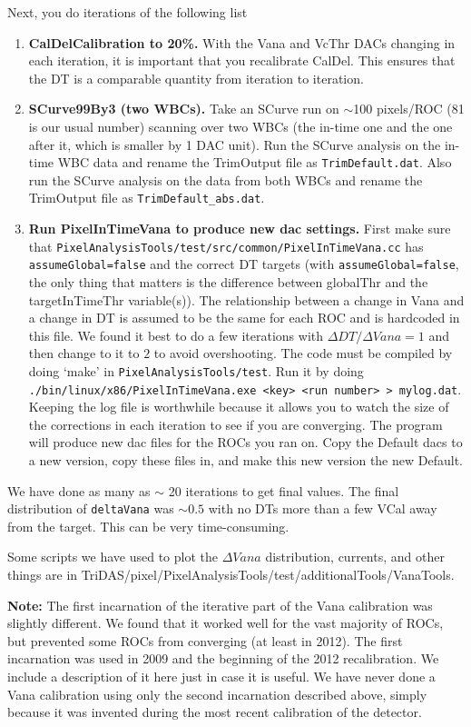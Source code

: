 Next, you do iterations of the following list
\begin{enumerate}
  \item {\bf CalDelCalibration to 20\%.}  With the Vana and VcThr DACs changing in
    each iteration, it is important that you recalibrate CalDel.  This ensures that
    the DT is a comparable quantity from iteration to iteration.
  \item {\bf SCurve99By3 (two WBCs).}  Take an SCurve run on $\sim$100 pixels/ROC (81 is our
    usual number) scanning over two WBCs (the in-time one and the one after it, which is
    smaller by 1 DAC unit).  Run the SCurve analysis on the in-time WBC data 
    and rename the TrimOutput file 
    as \verb|TrimDefault.dat|.  Also run the SCurve analysis on the data from both WBCs and
    rename the TrimOutput file as \verb|TrimDefault_abs.dat|.  
  \item {\bf Run PixelInTimeVana to produce new dac settings.}  First make sure that 
    \verb|PixelAnalysisTools/test/src/common/PixelInTimeVana.cc| has \verb|assumeGlobal=false| and the 
    correct DT targets (with \verb|assumeGlobal=false|, the only thing that matters is the difference between
    globalThr and the targetInTimeThr variable(s)).  The relationship between a change in Vana 
    and a change in DT is assumed
    to be the same for each ROC and is hardcoded in this file.  We found it best to do a few iterations with
    $\Delta DT / \Delta Vana = 1$ and then change to it to $2$ to avoid overshooting.
    The code must be compiled by doing `make' in \verb|PixelAnalysisTools/test|.  
    Run it by doing \verb|./bin/linux/x86/PixelInTimeVana.exe <key> <run number> > mylog.dat|. 
    Keeping the 
    log file is worthwhile because it allows you to watch the size of the corrections in each
    iteration to see if you are converging.  The program will produce new dac files for the ROCs you ran on.
    Copy the Default dacs to a new version, copy these files in, and make this new version the new Default.
\end{enumerate}
We have done as many as $\sim$ 20 iterations to get final values.  The final distribution of \verb|deltaVana|
was $\sim 0.5$ with no DTs more than a few VCal away from the target.  This can be very time-consuming.

Some scripts we have used to plot the $\Delta Vana$ distribution, currents, and other things are in
TriDAS/pixel/PixelAnalysisTools/test/additionalTools/VanaTools.

{\bf Note:} The first incarnation of the iterative part of the Vana calibration was slightly different.
We found that it worked well for the vast majority of ROCs, but prevented some ROCs from 
converging (at least in 2012).  The first incarnation was used in 2009 and the beginning of the 2012 
recalibration.  We include a description of it here just in case it is useful.
We have never done a Vana calibration using
only the second incarnation described above, simply because it was invented during 
the most recent calibration of the detector. 

